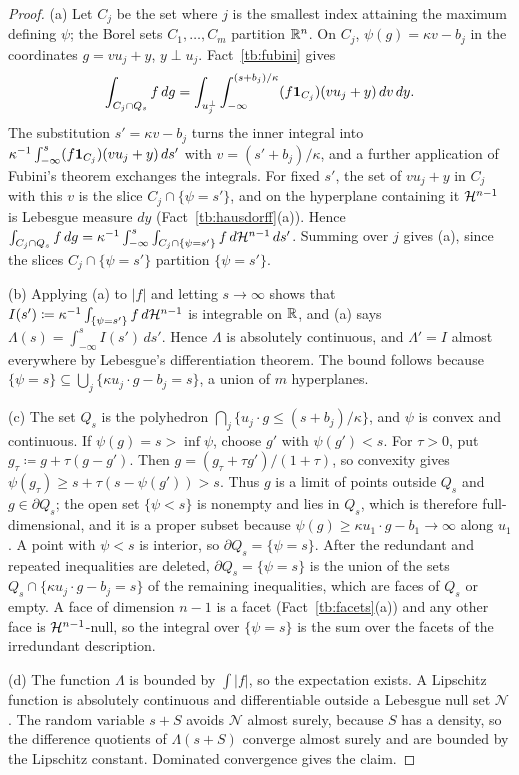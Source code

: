 \documentclass[11pt,letterpaper]{article}
\theoremstyle{plain}
\begin{document}
\begin{proof}
(a) Let \(C_j\) be the set where \(j\) is the smallest index attaining the
maximum defining \(\psi\); the Borel sets \(C_1,\ldots,C_m\) partition
\(\mathbb R^n\). On \(C_j\), \(\psi(g)=\kappa v-b_j\) in the coordinates
\(g=v u_j+y\), \(y\perp u_j\). Fact~\ref{tb:fubini} gives
\[
 \int_{C_j\cap Q_s}f\,dg=\int_{u_j^\perp}\int_{-\infty}^{(s+b_j)/\kappa}
 (f\mathbf 1_{C_j})(v u_j+y)\,dv\,dy .
\]
The substitution \(s'=\kappa v-b_j\) turns the inner integral into
\(\kappa^{-1}\int_{-\infty}^s(f\mathbf 1_{C_j})(v u_j+y)\,ds'\) with
\(v=(s'+b_j)/\kappa\), and a further application of Fubini's theorem
exchanges the integrals. For fixed \(s'\), the set of \(v u_j+y\) in \(C_j\)
with this \(v\) is the slice \(C_j\cap\{\psi=s'\}\), and on the hyperplane
containing it \(\mathcal H^{n-1}\) is Lebesgue measure \(dy\)
(Fact~\ref{tb:hausdorff}(a)). Hence
\(\int_{C_j\cap Q_s}f\,dg=\kappa^{-1}\int_{-\infty}^s\int_{C_j\cap\{\psi=s'\}}
f\,d\mathcal H^{n-1}\,ds'\). Summing over \(j\) gives (a), since the slices
\(C_j\cap\{\psi=s'\}\) partition \(\{\psi=s'\}\).

(b) Applying (a) to \(|f|\) and letting \(s\to\infty\) shows that
\(I(s')\coloneqq \kappa^{-1}\int_{\{\psi=s'\}}f\,d\mathcal H^{n-1}\) is integrable on
\(\mathbb R\), and (a) says \(\Lambda(s)=\int_{-\infty}^sI(s')\,ds'\). Hence \(\Lambda\) is
absolutely continuous, and \(\Lambda'=I\) almost everywhere by Lebesgue's
differentiation theorem. The bound follows because
\(\{\psi=s\}\subseteq\bigcup_j\{\kappa u_j\cdot g-b_j=s\}\), a union of \(m\)
hyperplanes.

(c) The set \(Q_s\) is the polyhedron \(\bigcap_j\{u_j\cdot g\le(s+b_j)/\kappa\}\),
and \(\psi\) is convex and continuous. If \(\psi(g)=s>\inf\psi\), choose \(g'\)
with \(\psi(g')<s\). For \(\tau>0\), put \(g_\tau\coloneqq g+\tau(g-g')\).
Then \(g=(g_\tau+\tau g')/(1+\tau)\), so convexity gives
\(\psi(g_\tau)\ge s+\tau(s-\psi(g'))>s\). Thus \(g\) is a limit of points
outside \(Q_s\) and \(g\in\partial Q_s\); the open set \(\{\psi<s\}\) is
nonempty and lies in \(Q_s\), which is therefore full-dimensional, and it
is a proper subset because \(\psi(g)\ge\kappa u_1\cdot g-b_1\to\infty\) along
\(u_1\). A point with \(\psi<s\) is interior, so \(\partial Q_s=\{\psi=s\}\). After
the redundant and repeated inequalities are deleted, \(\partial Q_s=\{\psi=s\}\)
is the union of the sets \(Q_s\cap\{\kappa u_j\cdot g-b_j=s\}\) of the
remaining inequalities, which are faces of \(Q_s\) or empty. A face of
dimension \(n-1\) is a facet (Fact~\ref{tb:facets}(a)) and any other face is
\(\mathcal H^{n-1}\)-null, so the integral over \(\{\psi=s\}\) is the sum over the
facets of the irredundant description.

(d) The function \(\Lambda\) is bounded by \(\int|f|\), so the expectation
exists. A Lipschitz function is absolutely continuous and differentiable outside a
Lebesgue null set \(\mathcal N\). The random variable \(s+S\) avoids
\(\mathcal N\) almost surely, because \(S\) has a density, so the difference
quotients of \(\Lambda(s+S)\) converge almost surely and are bounded by the
Lipschitz constant. Dominated convergence gives the claim.
\end{proof}
\end{document}
